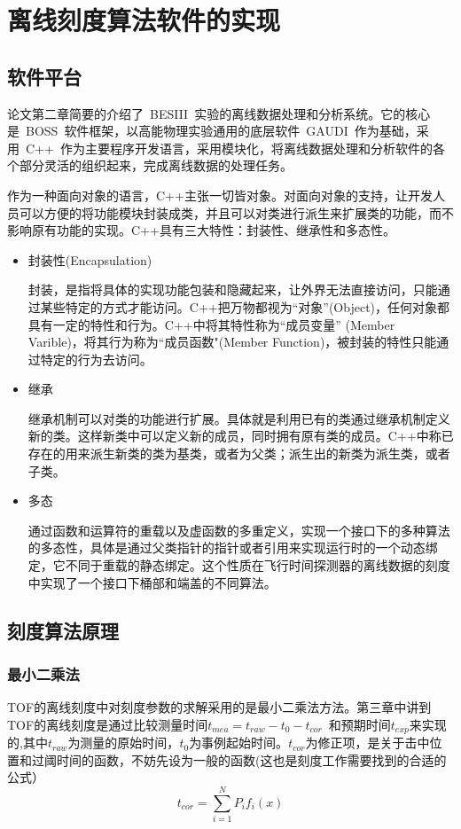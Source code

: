 \chapter{离线刻度算法软件的实现}
\section{软件平台}
论文第二章简要的介绍了~BESIII~实验的离线数据处理和分析系统。它的核心是~BOSS~\cite{liwd:2006}软件框架，以高能物理实验通用的底层软件~GAUDI~\cite{Barrand:2000}作为基础，采用~C++~作为主要程序开发语言，采用模块化，将离线数据处理和分析软件的各个部分灵活的组织起来，完成离线数据的处理任务。

作为一种面向对象的语言，C++主张一切皆对象。对面向对象的支持，让开发人员可以方便的将功能模块封装成类，并且可以对类进行派生来扩展类的功能，而不影响原有功能的实现。C++具有三大特性：封装性、继承性和多态性。\cite{C++Primer}
\begin{itemize}
\item{封装性(Encapsulation) 

    封装，是指将具体的实现功能包装和隐藏起来，让外界无法直接访问，只能通过某些特定的方式才能访问。C++把万物都视为“对象”(Object)，任何对象都具有一定的特性和行为。C++中将其特性称为“成员变量” (Member Varible)，将其行为称为“成员函数"(Member Function)，被封装的特性只能通过特定的行为去访问。}
\item{继承

     继承机制可以对类的功能进行扩展。具体就是利用已有的类通过继承机制定义新的类。这样新类中可以定义新的成员，同时拥有原有类的成员。C++中称已存在的用来派生新类的类为基类，或者为父类；派生出的新类为派生类，或者子类。
}
\item{多态

     通过函数和运算符的重载以及虚函数的多重定义，实现一个接口下的多种算法的多态性，具体是通过父类指针的指针或者引用来实现运行时的一个动态绑定，它不同于重载的静态绑定。这个性质在飞行时间探测器的离线数据的刻度中实现了一个接口下桶部和端盖的不同算法。}
\end{itemize}


\section{刻度算法原理}
\subsection{最小二乘法\cite{zhuys2006ss}}
TOF的离线刻度中对刻度参数的求解采用的是最小二乘法方法。第三章中讲到TOF的离线刻度是通过比较测量时间$t_{mea}=t_{raw}-t_{0}-t_{cor}$~和预期时间$t_{exp}$来实现的,其中$t_{raw}$为测量的原始时间，$t_{0}$为事例起始时间。$t_{cor}$为修正项，是关于击中位置和过阈时间的函数，不妨先设为一般的函数(这也是刻度工作需要找到的合适的公式）
\begin{equation}
t_{cor} =\sum\limits_{i=1}^{N} P_{i}f_{i}(x)
\end{equation}

